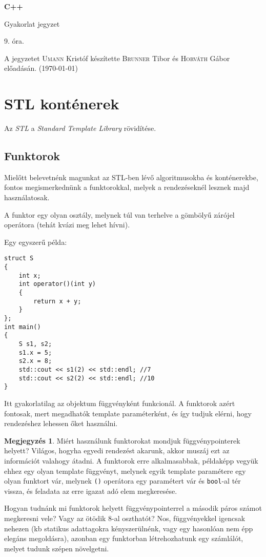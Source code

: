 \documentclass[a4paper,11.5pt,table]{article}
\begin{document}
	\setlength\parindent{0pt}
	\def\<{<\hspace{0mm}<}
	
	\theoremstyle{definition}
	\newtheorem{note}{Megjegyzés}[subsection]
	
	\begin{center}
		{\LARGE\textbf{C++}}
		
		{\Large Gyakorlat jegyzet}
		
		9. óra.
	\end{center}
	A jegyzetet \textsc{Umann} Kristóf készítette \textsc{Brunner} Tibor és \textsc{Horváth} Gábor előadásán. (\today)
	
	\section{STL konténerek}

	Az \textit{STL} a \textit{Standard Template Library} rövidítése.
	\subsection{Funktorok}
	Mielőtt belevetnénk magunkat az STL-ben lévő algoritmusokba és konténerekbe, fontos megismerkednünk a funktorokkal, melyek a rendezéseknél lesznek majd használatosak.
	\medskip
	
	A funktor egy olyan osztály, melynek túl van terhelve a gömbölyű zárójel operátora (tehát kvázi meg lehet hívni).
	
	\smallskip
	Egy egyszerű példa:
	\begin{lstlisting}
struct S
{
	int x;
	int operator()(int y)
	{
		return x + y;
	}
};
int main()
{
	S s1, s2;
	s1.x = 5;
	s2.x = 8;
	std::cout << s1(2) << std::endl; //7
	std::cout << s2(2) << std::endl; //10
}
	\end{lstlisting}
	Itt gyakorlatilag az objektum függvényként funkcionál. A funktorok azért fontosak, mert megadhatók template paraméterként, és így tudjuk elérni, hogy rendezéshez lehessen őket használni.
	\begin{note}
	Miért használunk funktorokat mondjuk függvénypointerek helyett? Világos, hogyha egyedi rendezést akarunk, akkor muszáj ezt az információt valahogy átadni. A funktorok erre alkalmasabbak, példaképp vegyük ehhez egy olyan template függvényt, melynek egyik template paramétere egy olyan funktort vár, melynek \texttt{()} operátora egy paramétert vár és \texttt{bool}-al tér vissza, és feladata az erre igazat adó elem megkeresése. 
	
	Hogyan tudnánk mi funktorok helyett függvénypointerrel a második páros számot megkeresni vele? Vagy az ötödik 8-al oszthatót? Nos, függvényekkel igencsak nehezen (kb statikus adattagokra kényszerülnénk, vagy egy hasonlóan nem épp elegáns megoldásra), azonban egy funktorban létrehozhatunk egy számlálót, melyet tudunk szépen növelgetni.
	\end{note}
	
\end{document}
